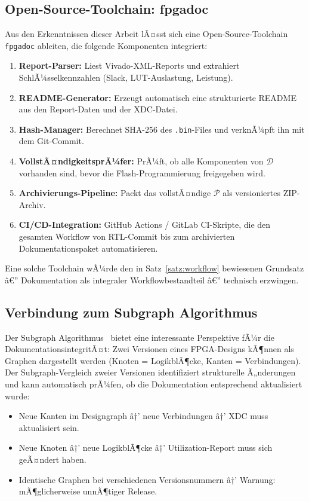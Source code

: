 ﻿\documentclass[a4paper,12pt]{article}
\theoremstyle{definition}
\begin{document}
\subsection{Open-Source-Toolchain: fpgadoc}

Aus den Erkenntnissen dieser Arbeit lÃ¤sst sich eine Open-Source-Toolchain
\texttt{fpgadoc} ableiten, die folgende Komponenten integriert:

\begin{enumerate}
    \item \textbf{Report-Parser:} Liest Vivado-XML-Reports und extrahiert
          SchlÃ¼sselkennzahlen (Slack, LUT-Auslastung, Leistung).
    \item \textbf{README-Generator:} Erzeugt automatisch eine strukturierte
          README aus den Report-Daten und der XDC-Datei.
    \item \textbf{Hash-Manager:} Berechnet SHA-256 des \texttt{.bin}-Files
          und verknÃ¼pft ihn mit dem Git-Commit.
    \item \textbf{VollstÃ¤ndigkeitsprÃ¼fer:} PrÃ¼ft, ob alle Komponenten
          von $\mathcal{D}$ vorhanden sind, bevor die Flash-Programmierung
          freigegeben wird.
    \item \textbf{Archivierungs-Pipeline:} Packt das vollstÃ¤ndige
          $\mathcal{P}$ als versioniertes ZIP-Archiv.
    \item \textbf{CI/CD-Integration:} GitHub Actions / GitLab CI-Skripte,
          die den gesamten Workflow von RTL-Commit bis zum archivierten
          Dokumentationspaket automatisieren.
\end{enumerate}

Eine solche Toolchain wÃ¼rde den in Satz~\ref{satz:workflow} bewiesenen
Grundsatz â€” Dokumentation als integraler Workflowbestandteil â€” technisch
erzwingen.

\subsection{Verbindung zum Subgraph Algorithmus}

Der Subgraph Algorithmus~\cite{epp2026} bietet eine interessante Perspektive
fÃ¼r die DokumentationsintegritÃ¤t: Zwei Versionen eines FPGA-Designs kÃ¶nnen
als Graphen dargestellt werden (Knoten = LogikblÃ¶cke, Kanten = Verbindungen).
Der Subgraph-Vergleich zweier Versionen identifiziert strukturelle Ã„nderungen
und kann automatisch prÃ¼fen, ob die Dokumentation entsprechend aktualisiert wurde:
\begin{itemize}
    \item Neue Kanten im Designgraph â†’ neue Verbindungen â†’ XDC muss
          aktualisiert sein.
    \item Neue Knoten â†’ neue LogikblÃ¶cke â†’ Utilization-Report muss
          sich geÃ¤ndert haben.
    \item Identische Graphen bei verschiedenen Versionsnummern â†’ Warnung:
          mÃ¶glicherweise unnÃ¶tiger Release.
\end{itemize}
\end{document}
